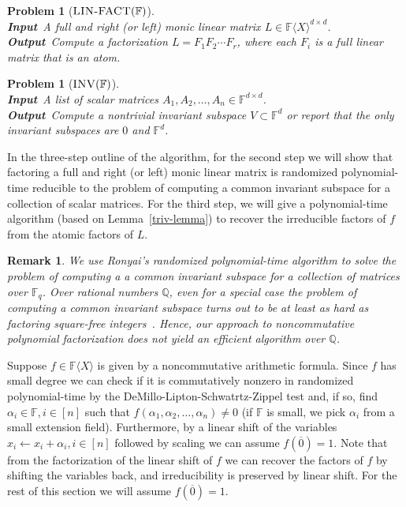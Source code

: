 \documentclass[10pt,a4paper]{article}
\newtheorem{remark}[theorem]{Remark}
\newtheorem{problem}[theorem]{Problem}
\newcommand{\F}{\mathbb{F}}
\renewcommand{\angle}[1]{\langle #1 \rangle}
\newcommand{\FX}{\F\angle{X}}
\newcommand{\Q}{\mathbb{Q}}
\newcommand{\fR}{\FX}
\newcommand{\prob}[1]{\textsc{#1}}
\begin{document}
\begin{problem}[$\prob{LIN{-}FACT}(\F)$]\hfill{~}\\
\textbf{Input}~A full and right (or left) monic linear matrix $L\in\fR^{d\times 
  d}$.\\  
\textbf{Output}~Compute a factorization
$L=F_1F_2\cdots F_r$, where each $F_i$ is a full linear matrix that is
an atom.
\end{problem}

\begin{problem}[$\prob{INV}(\F)$]\hfill{~}\\
\textbf{Input}~A list of scalar matrices $A_1,A_2,\ldots,A_n\in
\F^{d\times d}$.\\
\textbf{Output}~Compute a nontrivial invariant
subspace $V\subset \F^d$ or report that the only invariant subspaces
are $0$ and $\F^d$.
\end{problem}  

In the three-step outline of the algorithm, for the second step we
will show that factoring a full and right (or left) 
monic linear matrix is randomized polynomial-time reducible to the
problem of computing a common invariant subspace for a collection of
scalar matrices. For the third step, we will give a polynomial-time
algorithm (based on Lemma~\ref{triv-lemma}) to recover the irreducible
factors of $f$ from the atomic factors of $L$.

\begin{remark}
  We use Ronyai's randomized polynomial-time algorithm \cite{Ronyai2}
  to solve the problem of computing a a common invariant subspace for
  a collection of matrices over $\F_q$.  Over rational numbers $\Q$,
  even for a special case the problem of computing a common invariant
  subspace turns out to be at least as hard as factoring square-free
  integers~\cite{FR85}. Hence, our approach to noncommutative
  polynomial factorization does not yield an efficient algorithm over
  $\Q$.
\end{remark}

Suppose $f\in\fR$ is given by a noncommutative arithmetic
formula. Since $f$ has small degree we can check if it is
commutatively nonzero in randomized polynomial-time by the
DeMillo-Lipton-Schwatrtz-Zippel test \cite{DL78,Sch80,Zip79} and, if
so, find $\alpha_i\in\F, i\in[n]$ such that
$f(\alpha_1,\alpha_2,\ldots,\alpha_n)\ne 0$ (if $\F$ is small, we pick
$\alpha_i$ from a small extension field). Furthermore, by a linear
shift of the variables $x_i\leftarrow x_i + \alpha_i, i\in[n]$
followed by scaling we can assume $f(\overline{0}) = 1$. Note that
from the factorization of the linear shift of $f$ we can recover the
factors of $f$ by shifting the variables back, and irreducibility is
preserved by linear shift. For the rest of this section we will
assume $f(\overline{0})=1$. 
\end{document}
